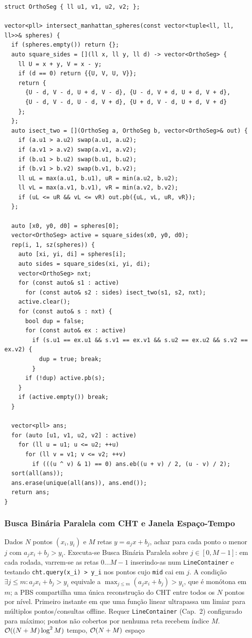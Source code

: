 \begin{lstlisting}
struct OrthoSeg { ll u1, v1, u2, v2; };

vector<pll> intersect_manhattan_spheres(const vector<tuple<ll, ll, ll>>& spheres) {
  if (spheres.empty()) return {};
  auto square_sides = [](ll x, ll y, ll d) -> vector<OrthoSeg> {
    ll U = x + y, V = x - y;
    if (d == 0) return {{U, V, U, V}};
    return {
      {U - d, V - d, U + d, V - d}, {U - d, V + d, U + d, V + d},
      {U - d, V - d, U - d, V + d}, {U + d, V - d, U + d, V + d}
    };
  };
  auto isect_two = [](OrthoSeg a, OrthoSeg b, vector<OrthoSeg>& out) {
    if (a.u1 > a.u2) swap(a.u1, a.u2);
    if (a.v1 > a.v2) swap(a.v1, a.v2);
    if (b.u1 > b.u2) swap(b.u1, b.u2);
    if (b.v1 > b.v2) swap(b.v1, b.v2);
    ll uL = max(a.u1, b.u1), uR = min(a.u2, b.u2);
    ll vL = max(a.v1, b.v1), vR = min(a.v2, b.v2);
    if (uL <= uR && vL <= vR) out.pb({uL, vL, uR, vR});
  };

  auto [x0, y0, d0] = spheres[0];
  vector<OrthoSeg> active = square_sides(x0, y0, d0);
  rep(i, 1, sz(spheres)) {
    auto [xi, yi, di] = spheres[i];
    auto sides = square_sides(xi, yi, di);
    vector<OrthoSeg> nxt;
    for (const auto& s1 : active)
      for (const auto& s2 : sides) isect_two(s1, s2, nxt);
    active.clear();
    for (const auto& s : nxt) {
      bool dup = false;
      for (const auto& ex : active)
        if (s.u1 == ex.u1 && s.v1 == ex.v1 && s.u2 == ex.u2 && s.v2 == ex.v2) {
          dup = true; break;
        }
      if (!dup) active.pb(s);
    }
    if (active.empty()) break;
  }

  vector<pll> ans;
  for (auto [u1, v1, u2, v2] : active)
    for (ll u = u1; u <= u2; ++u)
      for (ll v = v1; v <= v2; ++v)
        if (((u ^ v) & 1) == 0) ans.eb((u + v) / 2, (u - v) / 2);
  sort(all(ans));
  ans.erase(unique(all(ans)), ans.end());
  return ans;
}
\end{lstlisting}

\subsubsection{Busca Binária Paralela com CHT e Janela Espaço-Tempo}
\algobox
  {Dados $N$ pontos $(x_i, y_i)$ e $M$ retas $y = a_j x + b_j$, achar para cada ponto o menor $j$ com $a_j x_i + b_j > y_i$.}
  {Executa-se Busca Binária Paralela sobre $j \in [0, M-1]$: em cada rodada, varrem-se as retas $0 \dots M-1$ inserindo-as num \texttt{LineContainer} e testando \texttt{cht.query(x\_i) > y\_i} nos pontos cujo \texttt{mid} cai em $j$.}
  {A condição $\exists j \le m : a_j x_i + b_j > y_i$ equivale a $\max_{j \le m}(a_j x_i + b_j) > y_i$, que é monótona em $m$; a PBS compartilha uma única reconstrução do CHT entre todos os $N$ pontos por nível.}
  {Primeiro instante em que uma função linear ultrapassa um limiar para múltiplos pontos/consultas offline.}
  {Requer \texttt{LineContainer} (Cap.~2) configurado para máximo; pontos não cobertos por nenhuma reta recebem índice $M$.}
  {$\mathcal{O}((N + M) \log^2 M)$ tempo, $\mathcal{O}(N + M)$ espaço}

